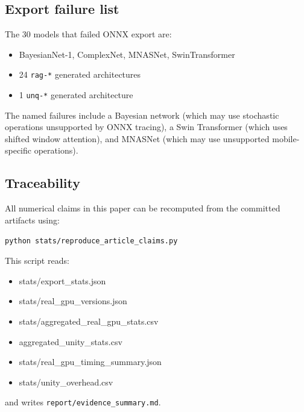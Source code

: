 \documentclass[10pt,twocolumn,letterpaper]{article}
\begin{document}
\subsection{Export failure list}

The 30 models that failed ONNX export are:
\begin{itemize}[nosep,leftmargin=*,font=\small\ttfamily]
  \item BayesianNet-1, ComplexNet, MNASNet, SwinTransformer
  \item 24 \texttt{rag-*} generated architectures
  \item 1 \texttt{unq-*} generated architecture
\end{itemize}
The named failures include a Bayesian network (which may use stochastic operations unsupported by ONNX tracing), a Swin Transformer (which uses shifted window attention), and MNASNet (which may use unsupported mobile-specific operations).

\subsection{Traceability}

All numerical claims in this paper can be recomputed from the committed artifacts using:
\begin{center}
\texttt{python stats/reproduce\_article\_claims.py}
\end{center}
This script reads:
\begin{itemize}[nosep,leftmargin=*,font=\small\ttfamily]
  \item stats/export\_stats.json
  \item stats/real\_gpu\_versions.json
  \item stats/aggregated\_real\_gpu\_stats.csv
  \item aggregated\_unity\_stats.csv
  \item stats/real\_gpu\_timing\_summary.json
  \item stats/unity\_overhead.csv
\end{itemize}
and writes \texttt{report/evidence\_summary.md}.
\end{document}
